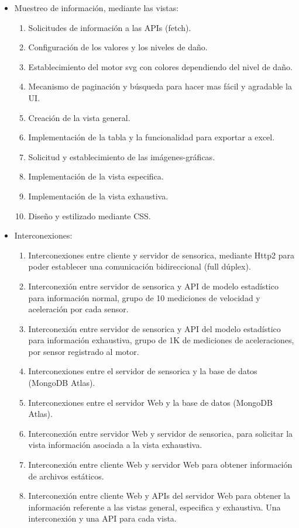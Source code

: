 \begin{itemize}
    \item Muestreo de información, mediante las vistas:
        \begin{enumerate}
            \item Solicitudes de información a las APIs (fetch).
            \item Configuración de los valores y los niveles de daño.
            \item Establecimiento del motor svg con colores dependiendo del nivel
                de daño.
            \item Mecanismo de paginación y búsqueda para hacer mas fácil y agradable
                la UI.
            \item Creación de la vista general.
            \item Implementación de la tabla y la funcionalidad para exportar a
                excel.
            \item Solicitud y establecimiento de las imágenes-gráficas.
            \item Implementación de la vista especifica.
            \item Implementación de la vista exhaustiva.
            \item Diseño y estilizado mediante CSS.
        \end{enumerate}

    \item Interconexiones:
        \begin{enumerate}
            \item Interconexiones entre cliente y servidor de sensorica, mediante
                Http2 para poder establecer una comunicación bidireccional (full dúplex).
            \item Interconexión entre servidor de sensorica y API de modelo
                estadístico para información normal, grupo de 10
                mediciones de velocidad y aceleración por cada sensor.
            \item Interconexión entre servidor de sensorica y API del modelo
                estadístico para información exhaustiva, grupo de 1K de mediciones
                de aceleraciones, por sensor registrado al motor.
            \item Interconexiones entre el servidor de sensorica y la base de datos
                (MongoDB Atlas).
            \item Interconexiones entre el servidor Web y la base de datos (MongoDB Atlas).
            \item Interconexión entre servidor Web y servidor de sensorica, para
                solicitar la vista información asociada a la vista exhaustiva.
            \item Interconexión entre cliente Web y servidor Web para obtener
                información de archivos estáticos.
            \item Interconexión entre cliente Web y APIs del servidor Web para
                obtener la información referente a las vistas general, especifica
                y exhaustiva. Una interconexión y una API para cada vista.
        \end{enumerate}
\end{itemize}


